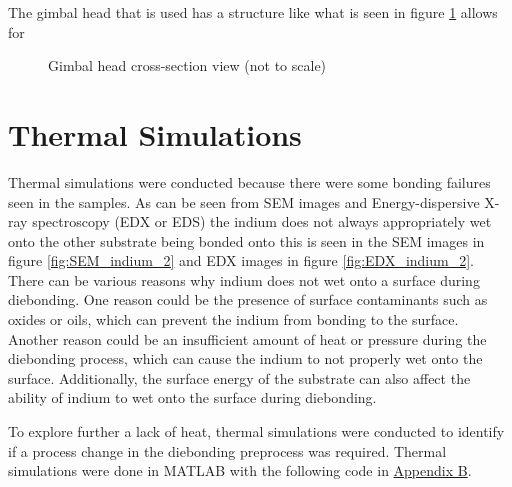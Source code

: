 The gimbal head that is used has a structure like what is seen in figure \ref{fig:gimbal_head}
allows for

\begin{figure}
    \centering
    \caption{Gimbal head cross-section view (not to scale)}
    \label{fig:gimbal_head}
\end{figure}



\section{Thermal Simulations}

Thermal simulations were conducted because there were some bonding failures seen in the samples. As can be seen from SEM images and Energy-dispersive X-ray spectroscopy (EDX or EDS) the indium does not always appropriately wet onto the other substrate being bonded onto this is seen in the SEM images in figure
\ref{fig:SEM_indium_2} and EDX images in figure \ref{fig:EDX_indium_2}.
There can be various reasons why indium does not wet onto a surface during diebonding. One reason could be the presence of surface contaminants such as oxides or oils, which can prevent the indium from bonding to the surface. Another reason could be an insufficient amount of heat or pressure during the diebonding process, which can cause the indium to not properly wet onto the surface. Additionally, the surface energy of the substrate can also affect the ability of indium to wet onto the surface during diebonding.

To explore further a lack of heat, thermal simulations were conducted to identify if a process change in the diebonding preprocess was required. Thermal simulations were done in MATLAB with the following code in
\hyperref[sec:ThermalSimulationCode]{Appendix B}.

